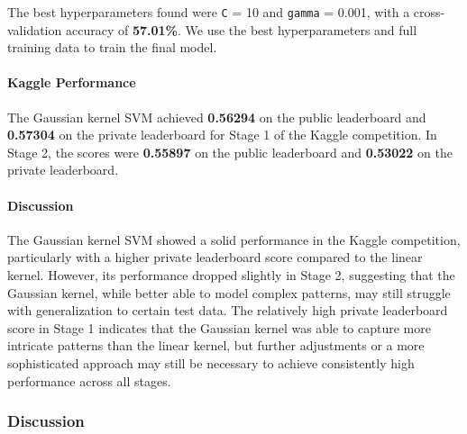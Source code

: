 \documentclass[12pt,a4paper]{article}
\begin{document}
The best hyperparameters found were \texttt{C} = 10 and \texttt{gamma} = 0.001, with a cross-validation accuracy of \textbf{57.01\%}. We use the best hyperparameters and full training data to train the final model.


\paragraph{Kaggle Performance}

The Gaussian kernel SVM achieved \textbf{0.56294} on the public leaderboard and \textbf{0.57304} on the private leaderboard for Stage 1 of the Kaggle competition. In Stage 2, the scores were \textbf{0.55897} on the public leaderboard and \textbf{0.53022} on the private leaderboard.


\paragraph{Discussion}

The Gaussian kernel SVM showed a solid performance in the Kaggle competition, particularly with a higher private leaderboard score compared to the linear kernel. However, its performance dropped slightly in Stage 2, suggesting that the Gaussian kernel, while better able to model complex patterns, may still struggle with generalization to certain test data. The relatively high private leaderboard score in Stage 1 indicates that the Gaussian kernel was able to capture more intricate patterns than the linear kernel, but further adjustments or a more sophisticated approach may still be necessary to achieve consistently high performance across all stages.



\subsubsection{Discussion}
\end{document}
